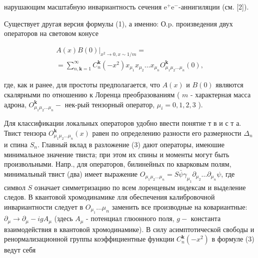 \documentclass[10pt]{article}
\begin{document}
нарушающим масштабную инвариантность сечения $\mathrm{e}^{+} \mathrm{e}^{-}$-аннигиляции (см. [2]).



Существует другая версия формулы (1), а именно: О.p. произведения двух операторов на световом конусе



\[

\begin{gathered}

\left.A(x) B(0)\right|_{x^{2} \rightarrow 0, x \sim 1 / m}= \\

=\sum_{n, \mathbf{k}=1}^{\infty} C_{n}^{\mathbf{k}}\left(-x^{2}\right) x_{\mu_{1}} x_{\mu_{2}} \ldots x_{\mu_{n}} O_{\mu_{1} \mu_{2} \ldots \mu_{n}}^{\mathbf{k}}(0),

\end{gathered}

\]



где, как и ранее, для простоты предполагается, что $A(x)$ и $B(0)$ являются скалярными по отношению к Лоренца преобразованиям ( $m$ - характерная масса адрона, $O_{\mu_{1} \mu_{2} \ldots \mu_{n}}^{\mathbf{k}}-$ нек-рый тензорный оператор, $\mu_{i}=0,1,2,3$ ).



Для классификации локальных операторов удобно ввести понятие т в и с т а. Твист тензора $O_{\mu_{1} \mu_{2} \ldots \mu_{n}}^{\mathbf{k}}(x)$ равен по определению разности его размерности $\Delta_{n}$ и спина $S_{n}$. Главный вклад в разложение (3) дают операторы, имеюшие минимальное значение твиста; при этом их спины и моменты могут быть произвольными. Напр., для операторов, билинейных по кварковым полям, минимальный твист (два) имеет выражение $O_{\mu_{1} \mu_{2} \ldots \mu_{n}}=S \bar{\psi} \gamma_{\mu_{1}} \partial_{\mu_{2}} \ldots \partial_{\mu_{n}} \psi$, где символ $S$ означает симметризацию по всем лоренцевым индексам и выделение следов. В квантовой хромодинамике лля обеспечения калибровочной инвариантности следует в $O_{\mu_{1}} \ldots \mu_{n}$ заменить все производные на ковариантные: $\partial_{\mu} \rightarrow \partial_{\mu}-i g A_{\mu}$ (здесь $A_{\mu}$ - потенциал глюонного поля, $g-$ константа взаимодействия в квантовой хромодинамике). В силу асимптотической свободы и ренормализационной группы коэффициентные функции $C_{n}^{\mathbf{k}}\left(-x^{2}\right)$ в формуле (3) ведут себя
\end{document}
